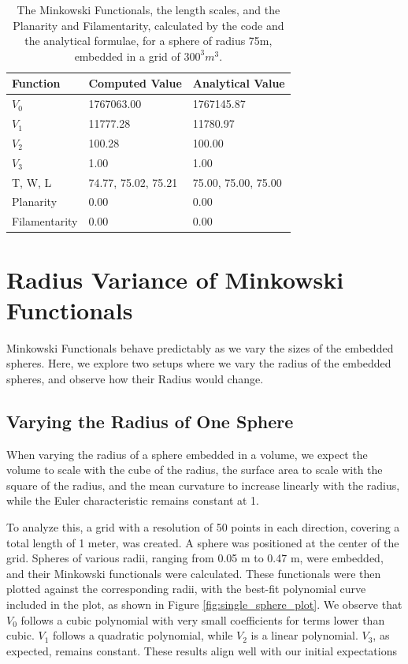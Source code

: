 \documentclass{article}
\begin{document}
\begin{table}[]
	\centering
	\begin{tabular}{|l|l|l|}
		\hline
		\textbf{Function} & \textbf{Computed Value} & \textbf{Analytical Value} \\ \hline
		$V_0$             & 1767063.00              & 1767145.87                \\ \hline
		$V_1$             & 11777.28                & 11780.97                  \\ \hline
		$V_2$             & 100.28                  & 100.00                    \\ \hline
		$V_3$             & 1.00                    & 1.00                      \\ \hline
		T, W, L           & 74.77, 75.02, 75.21     & 75.00, 75.00, 75.00       \\ \hline
		Planarity         & 0.00                    & 0.00                      \\ \hline
		Filamentarity     & 0.00                    & 0.00                      \\ \hline
	\end{tabular}
	\label{tab:wrapper_function_outputs}
	\caption{The Minkowski Functionals, the length scales, and the Planarity and Filamentarity, calculated by the code and the analytical formulae, for a sphere of radius 75m, embedded in a grid of $300^3 m^3$.}
\end{table}


\section{Radius Variance of Minkowski Functionals}

Minkowski Functionals behave predictably as we vary the sizes of the embedded spheres. Here, we explore two setups where we vary the radius of the embedded spheres, and observe how their Radius would change.

\subsection{Varying the Radius of One Sphere}
When varying the radius of a sphere embedded in a volume, we expect the volume to scale with the cube of the radius, the surface area to scale with the square of the radius, and the mean curvature to increase linearly with the radius, while the Euler characteristic remains constant at 1.

To analyze this, a grid with a resolution of 50 points in each direction, covering a total length of 1 meter, was created. A sphere was positioned at the center of the grid. Spheres of various radii, ranging from 0.05 m to 0.47 m, were embedded, and their Minkowski functionals were calculated. These functionals were then plotted against the corresponding radii, with the best-fit polynomial curve included in the plot, as shown in Figure \ref{fig:single_sphere_plot}. We observe that \(V_0\) follows a cubic polynomial with very small coefficients for terms lower than cubic. \(V_1\) follows a quadratic polynomial, while \(V_2\) is a linear polynomial. \(V_3\), as expected, remains constant. These results align well with our initial expectations
\end{document}
